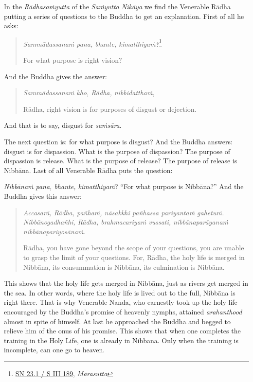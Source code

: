 In the \emph{Rādhasaṁyutta} of the \emph{Saṁyutta Nikāya} we find the Venerable Rādha putting a series of questions to the Buddha to get an explanation. First of all he asks:

\begin{quote}
\emph{Sammādassanaṁ pana, bhante, kimatthiyaṁ?}\footnote{\href{https://suttacentral.net/sn23.1/pli/ms}{SN 23.1 / S III 189}, \emph{Mārasutta}}

For what purpose is right vision?
\end{quote}

And the Buddha gives the answer:

\begin{quote}
\emph{Sammādassanaṁ kho, Rādha, nibbidatthaṁ},

Rādha, right vision is for purposes of disgust or dejection.
\end{quote}

And that is to say, disgust for \emph{saṁsāra}.

The next question is: for what purpose is disgust? And the Buddha answers: disgust is for dispassion. What is the purpose of dispassion? The purpose of dispassion is release. What is the purpose of release? The purpose of release is Nibbāna. Last of all Venerable Rādha puts the question:

\emph{Nibbānaṁ pana, bhante, kimatthiyaṁ}? ``For what purpose is Nibbāna?'' And the Buddha gives this answer:

\begin{quote}
\emph{Accasarā, Rādha, pañhaṁ, nāsakkhi pañhassa pariyantaṁ gahetuṁ. Nibbānogadhañhi, Rādha, brahmacariyaṁ vussati, nibbānaparāyanaṁ nibbānapariyosānaṁ.}

Rādha, you have gone beyond the scope of your questions, you are unable to grasp the limit of your questions. For, Rādha, the holy life is merged in Nibbāna, its consummation is Nibbāna, its culmination is Nibbāna.
\end{quote}

This shows that the holy life gets merged in Nibbāna, just as rivers get merged in the sea. In other words, where the holy life is lived out to the full, Nibbāna is right there. That is why Venerable Nanda, who earnestly took up the holy life encouraged by the Buddha's promise of heavenly nymphs, attained \emph{arahanthood} almost in spite of himself. At last he approached the Buddha and begged to relieve him of the onus of his promise. This shows that when one completes the training in the Holy Life, one is already in Nibbāna. Only when the training is incomplete, can one go to heaven.

